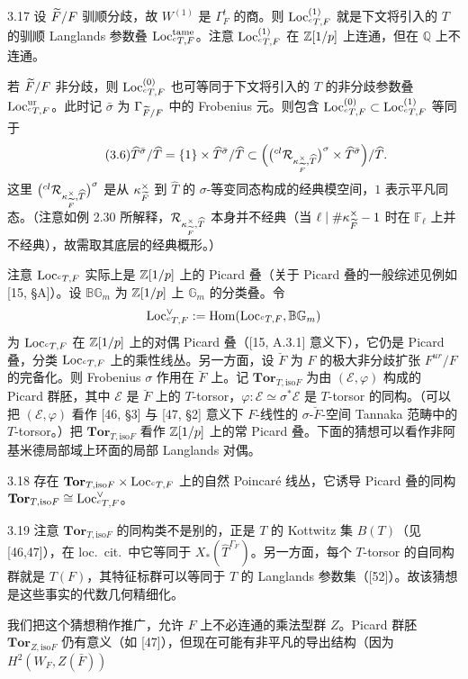 \begin{exam}{3.17}
设 $\widetilde F/F$ 驯顺分歧，故 $W^{(1)}$ 是 $\Gamma^t_F$ 的商。则 $\operatorname{Loc}^{(1)}_{{}^cT,F}$ 就是下文将引入的 $T$ 的驯顺 Langlands 参数叠 $\operatorname{Loc}^{\mathrm{tame}}_{{}^cT,F}$。注意 $\operatorname{Loc}^{(1)}_{{}^cT,F}$ 在 $\mathbb{Z}[1/p]$ 上连通，但在 $\mathbb Q$ 上不连通。

若 $\widetilde F/F$ 非分歧，则 $\operatorname{Loc}^{(0)}_{{}^cT,F}$ 也可等同于下文将引入的 $T$ 的非分歧参数叠 $\operatorname{Loc}^{\mathrm{ur}}_{{}^cT,F}$。此时记 $\bar\sigma$ 为 $\Gamma_{\widetilde F/F}$ 中的 Frobenius 元。则包含 $\operatorname{Loc}^{(0)}_{{}^cT,F}\subset\operatorname{Loc}^{(1)}_{{}^cT,F}$ 等同于
\begin{equation*}\tag{3.6}
\widehat{T}^{\bar\sigma}/\widehat{T}=\{1\}\times\widehat{T}^{\bar\sigma}/\widehat{T}
\subset\Big(\big({}^{cl}\mathcal R_{\kappa_{\widetilde F}^\times,\widehat{T}}\big)^\sigma\times\widehat{T}^{\bar\sigma}\Big)/\widehat{T}.
\end{equation*}
这里 $\big({}^{cl}\mathcal R_{\kappa_{\widetilde F}^\times,\widehat{T}}\big)^\sigma$ 是从 $\kappa_{\widetilde F}^\times$ 到 $\widehat{T}$ 的 $\sigma$-等变同态构成的经典模空间，$1$ 表示平凡同态。（注意如例 2.30 所解释，$\mathcal R_{\kappa_{\widetilde F}^\times,\widehat{T}}$ 本身并不经典（当 $\ell\mid\#\kappa_{\widetilde F}^\times-1$ 时在 $\mathbb F_\ell$ 上并不经典），故需取其底层的经典概形。）
\end{exam}

注意 $\operatorname{Loc}_{{}^cT,F}$ 实际上是 $\mathbb{Z}[1/p]$ 上的 Picard 叠（关于 Picard 叠的一般综述见例如 [15, §A]）。设 $\mathbb{B}\mathbb G_m$ 为 $\mathbb{Z}[1/p]$ 上 $\mathbb G_m$ 的分类叠。令
\[
\operatorname{Loc}^{\vee}_{{}^cT,F}:=\operatorname{Hom}(\operatorname{Loc}_{{}^cT,F},\mathbb{B}\mathbb G_m)
\]
为 $\operatorname{Loc}_{{}^cT,F}$ 在 $\mathbb{Z}[1/p]$ 上的对偶 Picard 叠（[15, A.3.1] 意义下），它仍是 Picard 叠，分类 $\operatorname{Loc}_{{}^cT,F}$ 上的乘性线丛。另一方面，设 $\breve F$ 为 $F$ 的极大非分歧扩张 $F^{ur}/F$ 的完备化。则 Frobenius $\sigma$ 作用在 $\breve F$ 上。记 $\mathbf{Tor}_{T,\mathrm{iso}F}$ 为由 $(\mathcal E,\varphi)$ 构成的 Picard 群胚，其中 $\mathcal E$ 是 $\breve F$ 上的 $T$-torsor，$\varphi:\mathcal E\simeq\sigma^*\mathcal E$ 是 $T$-torsor 的同构。（可以把 $(\mathcal E,\varphi)$ 看作 [46, §3] 与 [47, §2] 意义下 $F$-线性的 $\sigma$-$\breve F$-空间 Tannaka 范畴中的 $T$-torsor。）把 $\mathbf{Tor}_{T,\mathrm{iso}F}$ 看作 $\mathbb{Z}[1/p]$ 上的常 Picard 叠。下面的猜想可以看作非阿基米德局部域上环面的局部 Langlands 对偶。

\begin{conj}{3.18}
存在 $\mathbf{Tor}_{T,\mathrm{iso}F}\times\operatorname{Loc}_{{}^cT,F}$ 上的自然 Poincaré 线丛，它诱导 Picard 叠的同构 $\mathbf{Tor}_{T,\mathrm{iso}F}\cong\operatorname{Loc}^{\vee}_{{}^cT,F}$。
\end{conj}

\begin{rem}{3.19}
注意 $\mathbf{Tor}_{T,\mathrm{iso}F}$ 的同构类不是别的，正是 $T$ 的 Kottwitz 集 $B(T)$（见 [46,47]），在 loc.\ cit.\ 中它等同于 $X_*(\widehat{T}^{\Gamma_F})$。另一方面，每个 $T$-torsor 的自同构群就是 $T(F)$，其特征标群可以等同于 $T$ 的 Langlands 参数集（[52]）。故该猜想是这些事实的代数几何精细化。
\end{rem}

我们把这个猜想稍作推广，允许 $F$ 上不必连通的乘法型群 $Z$。Picard 群胚 $\mathbf{Tor}_{Z,\mathrm{iso}F}$ 仍有意义（如 [47]），但现在可能有非平凡的导出结构（因为 $H^2(W_F,Z(\bar F))$
